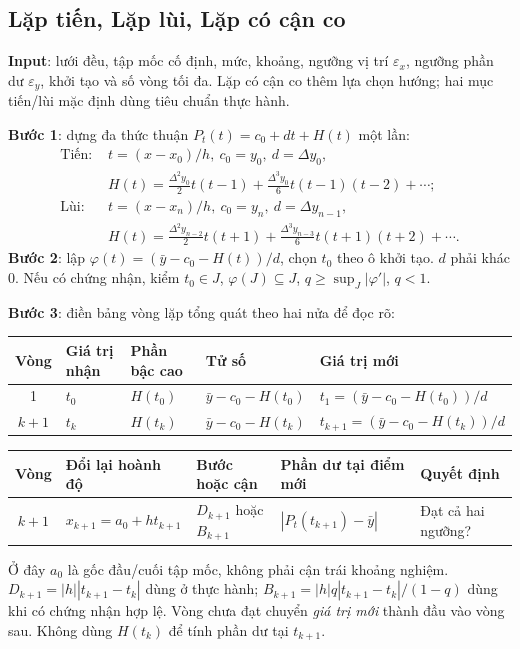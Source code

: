 \subsection{Lặp tiến, Lặp lùi, Lặp có cận co}
\textbf{Input}: lưới đều, tập mốc cố định, mức, khoảng, ngưỡng vị trí $\varepsilon_x$, ngưỡng phần dư $\varepsilon_y$, khởi tạo và số vòng tối đa. Lặp có cận co thêm lựa chọn hướng; hai mục tiến/lùi mặc định dùng tiêu chuẩn thực hành.

\textbf{Bước 1}: dựng đa thức thuận $P_t(t)=c_0+dt+H(t)$ một lần:
\begin{align*}
\text{Tiến: }&t=(x-x_0)/h,\ c_0=y_0,\ d=\Delta y_0,\\
&H(t)=\tfrac{\Delta^2y_0}2t(t-1)+\tfrac{\Delta^3y_0}6t(t-1)(t-2)+\cdots;\\
\text{Lùi: }&t=(x-x_n)/h,\ c_0=y_n,\ d=\Delta y_{n-1},\\
&H(t)=\tfrac{\Delta^2y_{n-2}}2t(t+1)+\tfrac{\Delta^3y_{n-3}}6t(t+1)(t+2)+\cdots.
\end{align*}
\textbf{Bước 2}: lập $\varphi(t)=(\bar y-c_0-H(t))/d$, chọn $t_0$ theo ô khởi tạo. $d$ phải khác 0. Nếu có chứng nhận, kiểm $t_0\in J$, $\varphi(J)\subseteq J$, $q\ge\sup_J|\varphi'|$, $q<1$.

\textbf{Bước 3}: điền bảng vòng lặp tổng quát theo hai nửa để đọc rõ:
\begin{center}\small\begin{tabular}{cllll}\toprule
Vòng&Giá trị nhận&Phần bậc cao&Tử số&Giá trị mới\\\midrule
1&$t_0$&$H(t_0)$&$\bar y-c_0-H(t_0)$&$t_1=(\bar y-c_0-H(t_0))/d$\\
$k+1$&$t_k$&$H(t_k)$&$\bar y-c_0-H(t_k)$&$t_{k+1}=(\bar y-c_0-H(t_k))/d$\\\bottomrule
\end{tabular}\end{center}
\begin{center}\small\begin{tabular}{cllll}\toprule
Vòng&Đổi lại hoành độ&Bước hoặc cận&Phần dư tại điểm mới&Quyết định\\\midrule
$k+1$&$x_{k+1}=a_0+ht_{k+1}$&$D_{k+1}$ hoặc $B_{k+1}$&$|P_t(t_{k+1})-\bar y|$&Đạt cả hai ngưỡng?\\\bottomrule
\end{tabular}\end{center}
Ở đây $a_0$ là gốc đầu/cuối tập mốc, không phải cận trái khoảng nghiệm.
$D_{k+1}=|h||t_{k+1}-t_k|$ dùng ở thực hành;
$B_{k+1}=|h|q|t_{k+1}-t_k|/(1-q)$ dùng khi có chứng nhận hợp lệ.
Vòng chưa đạt chuyển \emph{giá trị mới} thành đầu vào vòng sau. Không dùng $H(t_k)$ để tính phần dư tại $t_{k+1}$.

